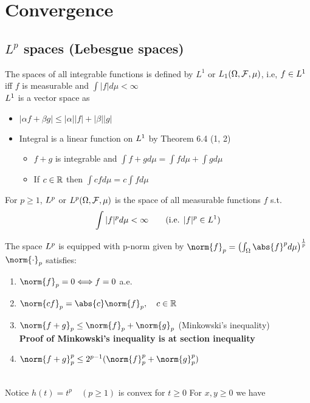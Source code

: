 \newpage
\section{Convergence}
\subsection{$L^p$ spaces (Lebesgue spaces)}
The spaces of all integrable functions is defined by $L^1$ or $L_1 (\Omega, \mathcal{F}, \mu)$, i.e, $f \in L^{1}$ iff $f$ is measurable and $\int |f| d\mu < \infty$ \\
$L^{1}$ is a vector space as 
\begin{itemize}
    \item $|\alpha f + \beta g| \leq |\alpha||f| + |\beta||g|$
    \item Integral is a linear function on $L^{1}$ by Theorem 6.4 (1, 2)
    \begin{itemize}
        \item $f+g$ is integrable and $\int f+g d\mu = \int f d\mu +\int g d\mu$
        \item If $c\in\mathbb{R}$ then $\int cf d\mu = c\int f d\mu$
    \end{itemize}
\end{itemize}
\begin{dfn}
For $p \geq 1$, $L^{p}$ or $L^{p}(\Omega, \mathcal{F}, \mu)$ is the space of all measurable functions $f$ s.t. 
\begin{equation*}
    \int |f|^p d\mu < \infty \qquad (\text{i.e. } |f|^p \in L^{1})
\end{equation*}
\end{dfn}
The space $L^{p}$ is equipped with p-norm given by $\norm{f}_p = \left( \into \abs{f}^p d\mu \right)^{\frac{1}{p}}$ \\
$\norm{\cdot}_p$ satisfies:
\begin{enumerate}
    \item $\norm{f}_p = 0 \Longleftrightarrow f = 0$ a.e.
    \item $\norm{cf}_p = \abs{c}\norm{f}_p, \quad c\in \R$
    \item $\norm{f+g}_p \leq \norm{f}_p +\norm{g}_p$ (Minkowski's inequality) \\
    \textbf{Proof of Minkowski's inequality is at section inequality}
    \item $\norm{f+g}_p^p \leq 2^{p-1}(\norm{f}_p^p +\norm{g}_p^p) $
\end{enumerate}
 \\
Notice $h(t) = t^p \quad (p \geq 1)$ is convex for $t \geq 0$ For $x,y\geq 0$ we have 
